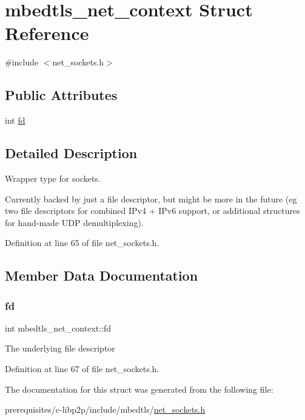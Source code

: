 \hypertarget{structmbedtls__net__context}{}\section{mbedtls\+\_\+net\+\_\+context Struct Reference}
\label{structmbedtls__net__context}


{\ttfamily \#include $<$net\+\_\+sockets.\+h$>$}

\subsection*{Public Attributes}
\begin{DoxyCompactItemize}
\item 
int \mbox{\hyperlink{structmbedtls__net__context_ad6eda44e3bfee722150d12a591408995}{fd}}
\end{DoxyCompactItemize}


\subsection{Detailed Description}
Wrapper type for sockets.

Currently backed by just a file descriptor, but might be more in the future (eg two file descriptors for combined I\+Pv4 + I\+Pv6 support, or additional structures for hand-\/made U\+DP demultiplexing). 

Definition at line 65 of file net\+\_\+sockets.\+h.



\subsection{Member Data Documentation}
\mbox{\label{structmbedtls__net__context_ad6eda44e3bfee722150d12a591408995}} 
\subsubsection{\texorpdfstring{fd}{fd}}
{\footnotesize\ttfamily int mbedtls\+\_\+net\+\_\+context\+::fd}

The underlying file descriptor 

Definition at line 67 of file net\+\_\+sockets.\+h.



The documentation for this struct was generated from the following file\+:\begin{DoxyCompactItemize}
\item 
prerequisites/c-\/libp2p/include/mbedtls/\mbox{\hyperlink{net__sockets_8h}{net\+\_\+sockets.\+h}}\end{DoxyCompactItemize}
